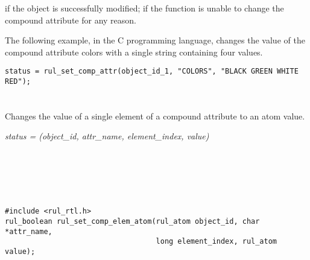 \ReturnValue

 if the object is successfully modified;  if the
function is unable to change the compound attribute for any reason.

\Example 

The following example, in the C programming language, changes the
value of the compound attribute colors with a single string containing
four values.

\begin{verbatim}
status = rul_set_comp_attr(object_id_1, "COLORS", "BLACK GREEN WHITE RED");
\end{verbatim}

\begin{seealso}




\end{seealso}

\section*{}

Changes the value of a single element of a compound attribute to an
atom value.

\Syntax

\it{status} = (\it{object\_id},
\it{attr\_name}, \it{element\_index}, \it{value})

\begin{args}
   \\
   \\
   \\
   \\
\end{args}

\CBinding
\begin{verbatim}
#include <rul_rtl.h>
rul_boolean rul_set_comp_elem_atom(rul_atom object_id, char *attr_name,
                                   long element_index, rul_atom value);
\end{verbatim}

